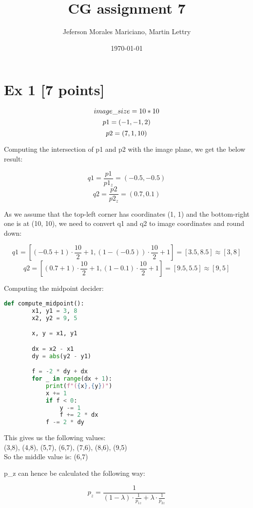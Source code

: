 \documentclass{article}
\title{CG assignment 7}
\author{Jeferson Morales Mariciano, Martin Lettry}
\date{\today}
\begin{document}
\maketitle

\section*{Ex 1 [7 points]}


\[
    image\_size = 10 * 10 \\
\]
\[
    p1 = (-1, -1, 2) \\
\]
\[
    p2 = (7, 1, 10) \\
\]

Computing the intersection of p1 and p2 with the image plane, we get the below result:

\[
    q1 = \frac{p1}{p1_z} = (-0.5, -0.5)
\]
\[
    q2 = \frac{p2}{p2_z} = (0.7, 0.1)
\]

As we assume that the top-left corner has coordinates (1, 1) and the bottom-right one is at (10, 10), we need to convert q1 and q2 to image coordinates and round down:

\[
    q1 = [(-0.5 + 1) \cdot \frac{10}{2} + 1, (1 - (-0.5)) \cdot \frac{10}{2} + 1] = [3.5, 8.5] \approx [3, 8]
\]
\[
    q2 = [(0.7 + 1) \cdot \frac{10}{2} + 1, (1 - 0.1) \cdot \frac{10}{2} + 1]
    = [9.5, 5.5] \approx [9, 5]
\]


Computing the midpoint decider:

\begin{lstlisting}[language=Python]
    def compute_midpoint():
        x1, y1 = 3, 8
        x2, y2 = 9, 5

        x, y = x1, y1

        dx = x2 - x1
        dy = abs(y2 - y1)

        f = -2 * dy + dx
        for _ in range(dx + 1):
            print(f"({x},{y})")
            x += 1
            if f < 0:
                y -= 1
                f += 2 * dx
            f -= 2 * dy
\end{lstlisting}


This gives us the following values: \\

(3,8), (4,8), (5,7), (6,7), (7,6), (8,6), (9,5) \\

So the middle value is: (6,7)

p\_z can hence be calculated the following way:

\[
    p_z = \frac{1}{(1 - \lambda) \cdot \frac{1}{p_{1z}} + \lambda \cdot \frac{1}{p_{2z}}}
\]
\end{document}
